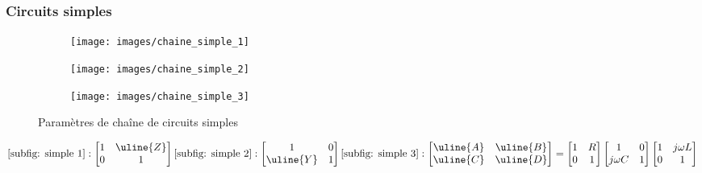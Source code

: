 \documentclass[12pt,a4paper]{article}
\newcommand{\uz}{\uline{Z} }
\newcommand{\uy}{\uline{Y} }
\newcommand{\ua}{\uline{A} }
\newcommand{\ub}{\uline{B} }
\newcommand{\uc}{\uline{C} }
\newcommand{\ud}{\uline{D} }
\begin{document}
\subsubsection{Circuits simples}
\begin{figure}[!h]
	\centering
	\begin{subfigure}[b]{0.3\textwidth}
		\centering
		\texttt{[image: images/chaine\_simple\_1]}
		\caption{}
		\label{subfig: simple 1}
	\end{subfigure}
	\begin{subfigure}[b]{0.3\textwidth}
		\centering
		\texttt{[image: images/chaine\_simple\_2]}
		\caption{}
		\label{subfig: simple 2}
	\end{subfigure}
	\begin{subfigure}[b]{0.3\textwidth}
		\centering
		\texttt{[image: images/chaine\_simple\_3]}
		\caption{}
		\label{subfig: simple 3}
	\end{subfigure}
	\caption{Paramètres de chaîne de circuits simples}
\end{figure}
\begin{align}
	\ref{subfig: simple 1} : \begin{bmatrix}
		1 & \uz \\
		0 & 1
	\end{bmatrix}	
	\ref{subfig: simple 2} : \begin{bmatrix}
		1 & 0 \\
		\uy & 1
	\end{bmatrix}	
	\ref{subfig: simple 3} : \begin{bmatrix}
		\ua & \ub \\
		\uc & \ud
	\end{bmatrix} = \begin{bmatrix}
		1 & R \\
		0 & 1
	\end{bmatrix}\begin{bmatrix}
		1 & 0\\
		j\omega C & 1
	\end{bmatrix}\begin{bmatrix}
		1 & j\omega L \\
		0 & 1
	\end{bmatrix}
\end{align}

\newpage
\appendix
\end{document}
